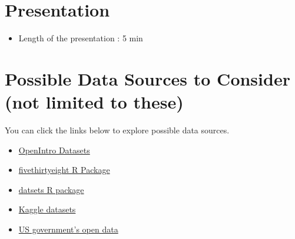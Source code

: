 \documentclass[12pt]{article}
\begin{document}
\section*{Presentation}
\begin{itemize}
    \item Length of the presentation : 5 min 

\end{itemize}



\section*{Possible Data Sources to Consider (not limited to these)}
You can click the links below to explore possible data sources.
\begin{itemize}
    \item \href{https://www.openintro.org/data/}{OpenIntro Datasets}
    \item \href{https://cran.r-project.org/web/packages/fivethirtyeight/vignettes/fivethirtyeight.html}{fivethirtyeight 
    R Package}
    \item \href{https://stat.ethz.ch/R-manual/R-devel/library/datasets/html/00Index.html}{datsets R package}
    \item \href{https://www.kaggle.com/datasets}{Kaggle datasets}
    \item \href{https://data.gov/}{US government's open data}
\end{itemize}

\end{document}
